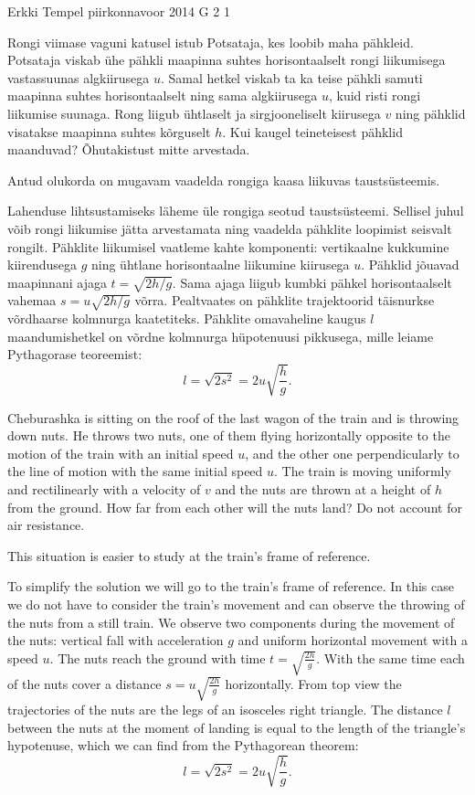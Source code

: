 {Erkki Tempel} %
{piirkonnavoor} %
{2014} %
{G 2} %
{1} %
{
\ifStatement
Rongi viimase vaguni katusel istub Potsataja, kes loobib maha pähkleid. Potsataja viskab ühe pähkli maapinna suhtes horisontaalselt rongi liikumisega vastassuunas algkiirusega $u$. Samal hetkel viskab ta ka teise pähkli samuti maapinna suhtes horisontaalselt ning sama algkiirusega $u$, kuid risti rongi liikumise suunaga. Rong liigub ühtlaselt ja sirgjooneliselt kiirusega $v$ ning pähklid visatakse maapinna suhtes kõrguselt $h$. Kui kaugel teineteisest pähklid maanduvad? Õhutakistust mitte arvestada.
\fi


\ifHint
Antud olukorda on mugavam vaadelda rongiga kaasa liikuvas taustsüsteemis.
\fi


\ifSolution
Lahenduse lihtsustamiseks läheme üle rongiga seotud taustsüsteemi. Sellisel juhul võib rongi liikumise jätta arvestamata ning vaadelda pähklite loopimist seisvalt rongilt. Pähklite liikumisel vaatleme kahte komponenti: vertikaalne kukkumine kiirendusega $g$ ning ühtlane horisontaalne liikumine kiirusega $u$. Pähklid jõuavad maapinnani ajaga 
$t=\sqrt{2h/g}$.
Sama ajaga liigub kumbki pähkel horisontaalselt vahemaa $s=u\sqrt{2h/g}$ võrra. Pealtvaates on pähklite trajektoorid täisnurkse võrdhaarse kolmnurga kaatetiteks. Pähklite omavaheline kaugus $l$ maandumishetkel on võrdne kolmnurga hüpotenuusi pikkusega, mille leiame Pythagorase teoreemist:
\[ l=\sqrt{2s^2}=2u\sqrt{\frac{h}{g}}. \]
\fi


\ifEngStatement
Cheburashka is sitting on the roof of the last wagon of the train and is throwing down nuts. He throws two nuts, one of them flying horizontally opposite to the motion of the train with an initial speed $u$, and the other one perpendicularly to the line of motion with the same initial speed $u$. The train is moving uniformly and rectilinearly with a velocity of $v$ and the nuts are thrown at a height of $h$ from the ground. How far from each other will the nuts land? Do not account for air resistance.
\fi


\ifEngHint
This situation is easier to study at the train’s frame of reference.
\fi


\ifEngSolution
To simplify the solution we will go to the train’s frame of reference. In this case we do not have to consider the train’s movement and can observe the throwing of the nuts from a still train. We observe two components during the movement of the nuts: vertical fall with acceleration $g$ and uniform horizontal movement with a speed $u$. The nuts reach the ground with time $t=\sqrt{\frac{2h}{g}}$. With the same time each of the nuts cover a distance $s=u\sqrt{\frac{2h}{g}}$ horizontally. From top view the trajectories of the nuts are the legs of an isosceles right triangle. The distance $l$ between the nuts at the moment of landing is equal to the length of the triangle’s hypotenuse, which we can find from the Pythagorean theorem: 
\[ l=\sqrt{2s^2}=2u\sqrt{\frac{h}{g}}. \]
\fi
}